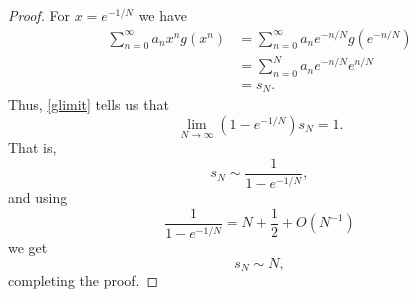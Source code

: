 \documentclass{article}
\theoremstyle{definition}
\begin{document}
\begin{proof}
For $x=e^{-1/N}$ we have
\begin{align*}
\sum_{n=0}^\infty a_n x^n g(x^n) &= \sum_{n=0}^\infty 
a_n e^{-n/N} g(e^{-n/N})\\
&=\sum_{n=0}^N a_n e^{-n/N} e^{n/N}\\
&=s_N.
\end{align*}
Thus, \eqref{glimit}  tells us that
\[
\lim_{N \to \infty} (1-e^{-1/N}) s_N = 1.
\]
That is,
\[
s_N \sim \frac{1}{1-e^{-1/N}},
\]
and using
\[
\frac{1}{1-e^{-1/N}} = N+\frac{1}{2}+O(N^{-1})
\]
we get
\[
s_N \sim N,
\]
completing the proof.
\end{proof}
\end{document}
